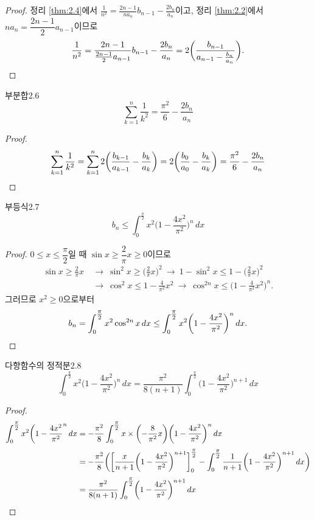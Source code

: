 \documentclass{article}
\begin{document}
\begin{proof}
	정리 \ref{thm:2.4}에서 $\displaystyle\frac{1}{n^2}=\frac{2n-1}{na_n}b_{n-1}-\frac{2b_n}{a_n}$이고, 정리 \ref{thm:2.2}에서 $na_n=\dfrac{2n-1}{2}a_{n-1}$이므로
	\[
		\frac{1}{n^2}=\frac{2n-1}{\frac{2n-1}{2}a_{n-1}}b_{n-1}-\frac{2b_n}{a_n}=2\biggl(\frac{b_{n-1}}{a_{n-1}-\frac{b_n}{a_n}}\biggr).\qedhere
	\]
\end{proof}

\begin{thm}{부분합}{2.6}
	\[
		\sum_{k=1}^n\frac{1}{k^2}=\frac{\pi^2}{6}-\frac{2b_n}{a_n}
	\]
\end{thm}

\begin{proof}
	\[
		\displaystyle\sum_{k=1}^n\frac{1}{k^2}=\sum_{k=1}^n2\biggl(\frac{b_{k-1}}{a_{k-1}}-\frac{b_k}{a_k}\biggr)=2\biggl(\frac{b_0}{a_0}-\frac{b_k}{a_k}\biggr)=\frac{\pi^2}{6}-\frac{2b_n}{a_n}\qedhere
	\]
\end{proof}

\begin{thm}{부등식}{2.7}
	\[
		b_n\leq\int_0^{\tfrac{\pi}{2}}x^2\biggl(1-\frac{4x^2}{\pi^2}\biggr)^n\,dx
	\]
\end{thm}

\begin{proof}
	$0\leq x\leq\dfrac{\pi}{2}$일 때 $\sin x\geq\dfrac{2}{\pi}x\geq0$이므로
	\begin{align*}
		\sin x\geq\frac{2}{\pi}x~&\longrightarrow~\sin^2x\geq\biggl(\frac{2}{\pi}x\biggr)^2~\longrightarrow~1-\sin^2x\leq1-\biggl(\frac{2}{\pi}x\biggr)^2\\[3pt]
	&\longrightarrow~\cos^2x\leq1-\frac{4}{\pi^2}x^2~\longrightarrow~\cos^{2n}x\leq\biggl(1-\frac{4}{\pi^2}x^2\biggr)^n.
	\end{align*}
	그러므로 $x^2\geq0$으로부터
	\[
		b_n=\int_0^{\tfrac{\pi}{2}}x^2\cos^{2n}x\,dx\leq\int_0^{\tfrac{\pi}{2}}x^2\biggl(1-\frac{4x^2}{\pi^2}\biggr)^n\,dx.\qedhere
	\]
\end{proof}

\begin{thm}{다항함수의 정적분}{2.8}
	\[
		\int_0^{\tfrac{\pi}{2}}x^2\biggl(1-\frac{4x^2}{\pi^2}\biggr)^n\,dx=\frac{\pi^2}{8(n+1)}\int_0^{\tfrac{\pi}{2}}\biggl(1-\frac{4x^2}{\pi^2}\biggr)^{n+1}\,dx
	\]
\end{thm}

\begin{proof}
	\begin{align*}
		\int_0^{\tfrac{\pi}{2}}x^2\biggl(1-\frac{4x^2}{\pi^2}^n\,dx&=-\frac{\pi^2}{8}\int_0^{\tfrac{\pi}{2}}x\times\biggl(-\frac{8}{\pi^2}x\biggr)\biggl(1-\frac{4x^2}{\pi^2}\biggr)^n\,dx\\[3pt]
		&=-\frac{\pi^2}{8}\biggl(\biggl[\frac{x}{n+1}\biggl(1-\frac{4x^2}{\pi^2}\biggr)^{n+1}\biggr]_0^{\tfrac{\pi}{2}}-\int_0^{\tfrac{\pi}{2}}\frac{1}{n+1}\biggl(1-\frac{4x^2}{\pi^2}\biggr)^{n+1}\,dx\biggr)\\[3pt]
		&=\frac{\pi^2}{8(n+1)}\int_0^{\tfrac{\pi}{2}}\biggl(1-\frac{4x^2}{\pi^2}\biggr)^{n+1}\,dx\qedhere
	\end{align*}
\end{proof}
\end{document}
